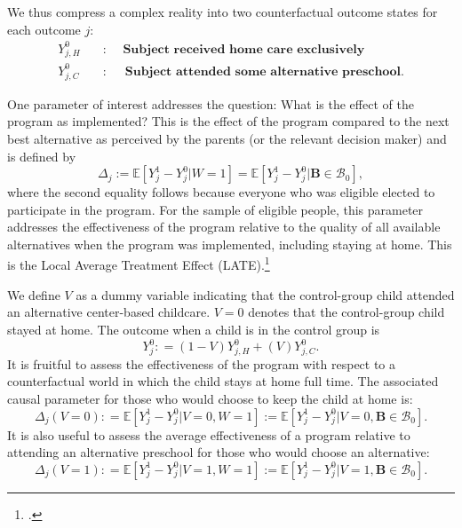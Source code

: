 We thus compress a complex reality into two counterfactual outcome states for each outcome $j$:
\begin{align*}
Y_{j,H}^0 \quad &: \quad \textbf{ Subject received home care exclusively} \\
Y_{j,C}^0 \quad &: \quad \textbf{ Subject attended some alternative preschool}.
\end{align*}


One parameter of interest addresses the question: What is the effect of the program as implemented? This is the effect of the program compared to the next best alternative as perceived by the parents (or the relevant decision maker) and is defined by
\begin{equation}\label{eq:effect}
\Delta_j := \mathbb{E} \left[ Y_{j}^1 -  Y_{j}^0 | W =1 \right] = \mathbb{E} \left[Y_{j}^1 -  Y_{j}^0 | \bm{B} \in \mathcal{B}_0 \right],
\end{equation}
where the second equality follows because everyone who was eligible elected to participate in the program. For the sample of eligible people, this parameter addresses the effectiveness of the program relative to the quality of all available alternatives when the program was implemented, including staying at home. This is the Local Average Treatment Effect (LATE).\footnote{\citet{Imbens_Angrist_1994_Econometrica}.}

We define $V$ as a dummy variable indicating that the control-group child attended an alternative center-based childcare. $V=0$ denotes that the control-group child stayed at home. The outcome when a child is in the control group is
\begin{equation}
Y_{j}^0 : = \left( 1 - V \right) Y_{j,H}^0 + \left( V \right) Y_{j,C}^0. \label{eq:meandiff}
\end{equation}
\noindent It is fruitful to assess the effectiveness of the program with respect to a counterfactual world in which the child stays at home full time. The associated causal parameter for those who would choose to keep the child at home is:
\begin{equation}\label{eq:cont1}
\Delta_j \left(V = 0 \right) : =   \mathbb{E} \left[ Y_{j}^1 -  Y_{j}^0 | V = 0, W = 1 \right] := \mathbb{E} \left[Y_{j}^1 -  Y_{j}^0 | V = 0, \bm{B} \in \mathcal{B}_0 \right].
\end{equation}
It is also useful to assess the average effectiveness of a program relative to attending an alternative preschool for those who would choose an alternative:
\begin{equation}\label{eq:cont2}
\Delta_j \left( V =1 \right) : =   \mathbb{E} \left[ Y_{j}^1 -  Y_{j}^0 | V = 1, W = 1 \right] := \mathbb{E} \left[ Y_{j}^1 -  Y_{j}^0 | V = 1, \bm{B} \in \mathcal{B}_0 \right].
\end{equation}

